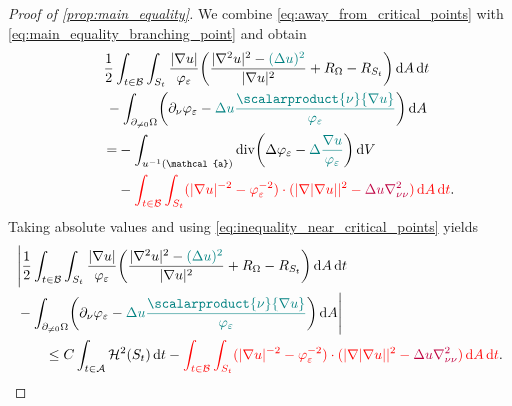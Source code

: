 \documentclass[draft]{amsart}
\newcommand*{\mathfullstop}{.}
\DeclarePairedDelimiter{\parens}{(}{)}
\let\p\parens %
\newcommand*{\laplacian}{\Delta}
\DeclareMathOperator{\divergence}{div}
\DeclarePairedDelimiter{\abs}{\lvert}{\rvert} %
\newcommand{\inverse}[1]{{#1}^{-1}}
\begin{document}
\begin{proof}[Proof of \cref{prop:main_equality}]
    We combine \cref{eq:away_from_critical_points} with \cref{eq:main_equality_branching_point} and obtain
    \begin{equation*}
        \begin{aligned}[t]
        &&\span\frac{1}{2}\int_{t\in \mathcal{B}}\int_{S_t}\frac{\abs{\nabla u}}{\varphi_\varepsilon}\p*{\frac{\abs{\nabla^2 u}^2-\nonHarmonic{(\laplacian u)^2}}{\abs{\nabla u}^2}+R_{\Omega}-R_{S_t}}\odif{A}\odif{t}\\
        &&\span-\int_{\nonzeroboundary}\p*{\partial_\nu \varphi_{\varepsilon}-\nonHarmonic{\laplacian u \frac{\scalarproduct{\nu}{\nabla u}}{\varphi_{\varepsilon}}}}\odif{A}\\
            &&\qquad=&-\int_{\inverse{u}(\mathcal{a})}\divergence\p*{\laplacian \varphi_{\varepsilon}-\nonHarmonic{\laplacian  \frac{\nabla u}{\varphi_{\varepsilon}}}}\odif{V}\\
            &&&{}-\additionalTerms{\int_{t\in \mathcal{B}}\int_{S_t}(\abs{\nabla u}^{-2}-\varphi_{\varepsilon}^{-2})\cdot (\abs{\nabla \abs{\nabla u}}^2 -\additionalNonHarmonicTerms{\laplacian u \nabla^2_{\nu \nu}})\odif A\odif t} \mathfullstop
         \end{aligned}
    \end{equation*}
    Taking absolute values and using \cref{eq:inequality_near_critical_points} yields
    \begin{equation}\label{eq:main_equality_nearly_there}
        \begin{aligned}[t]
        &\Bigg\lvert\frac{1}{2}\int_{t\in \mathcal{B}}\int_{S_t}\frac{\abs{\nabla u}}{\varphi_\varepsilon}\p*{\frac{\abs{\nabla^2 u}^2-\nonHarmonic{(\laplacian u)^2}}{\abs{\nabla u}^2}+R_{\Omega}-R_{S_t}}\odif{A}\odif{t}\\
        &{}-\int_{\nonzeroboundary}\p*{\partial_\nu \varphi_{\varepsilon}-\nonHarmonic{\laplacian u \frac{\scalarproduct{\nu}{\nabla u}}{\varphi_{\varepsilon}}}}\odif{A} \Bigg\rvert\\
            &\qquad\leq C\int_{t\in \mathcal{A}} \mathcal{H}^2(S_t)\odif{t}-\additionalTerms{\int_{t\in \mathcal{B}}\int_{S_t}(\abs{\nabla u}^{-2}-\varphi_{\varepsilon}^{-2})\cdot (\abs{\nabla \abs{\nabla u}}^2 -\additionalNonHarmonicTerms{\laplacian u \nabla^2_{\nu \nu}})\odif A\odif t }\mathfullstop
         \end{aligned}
    \end{equation}


\end{proof}
\end{document}

